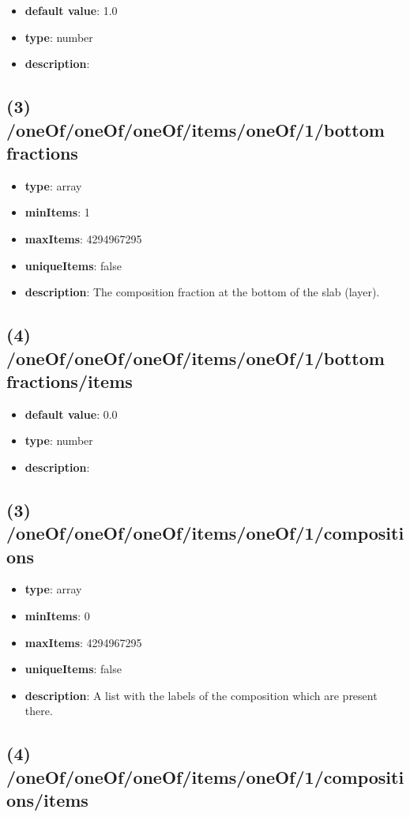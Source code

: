 \begin{itemize}[leftmargin=4em]\item {\bf default value}: 1.0
\item {\bf type}: number
\item {\bf description}: 
\end{itemize}\subsection{(3) /oneOf/oneOf/oneOf/items/oneOf/1/bottom fractions}
\begin{itemize}[leftmargin=3em]\item {\bf type}: array
\item {\bf minItems}: 1
\item {\bf maxItems}: 4294967295
\item {\bf uniqueItems}: false
\item {\bf description}: The composition fraction at the bottom of the slab (layer).
\end{itemize}\subsection{(4) /oneOf/oneOf/oneOf/items/oneOf/1/bottom fractions/items}
\begin{itemize}[leftmargin=4em]\item {\bf default value}: 0.0
\item {\bf type}: number
\item {\bf description}: 
\end{itemize}\subsection{(3) /oneOf/oneOf/oneOf/items/oneOf/1/compositions}
\begin{itemize}[leftmargin=3em]\item {\bf type}: array
\item {\bf minItems}: 0
\item {\bf maxItems}: 4294967295
\item {\bf uniqueItems}: false
\item {\bf description}: A list with the labels of the composition which are present there.
\end{itemize}\subsection{(4) /oneOf/oneOf/oneOf/items/oneOf/1/compositions/items}
